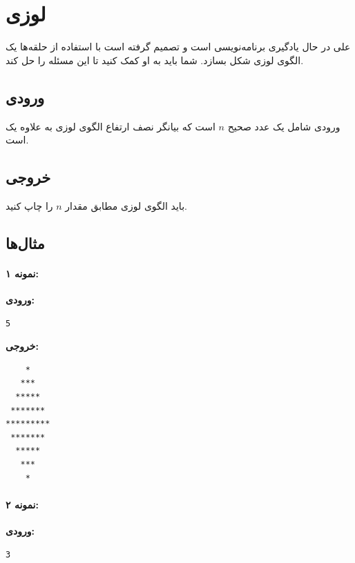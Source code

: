 \documentclass{article}
\begin{document}
\newpage

\section{لوزی}

علی در حال یادگیری برنامه‌نویسی است و تصمیم گرفته است با استفاده از حلقه‌ها یک الگوی لوزی شکل بسازد. شما باید به او کمک کنید تا این مسئله را حل کند.

\subsection{ورودی}

ورودی شامل یک عدد صحیح \( n \) است که بیانگر نصف ارتفاع الگوی لوزی به علاوه یک است.

\subsection{خروجی}

باید الگوی لوزی مطابق مقدار \( n \) را چاپ کنید.

\subsection{مثال‌ها}

\paragraph{نمونه ۱:}

\textbf{ورودی:}
\begin{LTR}
\begin{verbatim}
5
\end{verbatim}
\end{LTR}

\textbf{خروجی:}
\begin{LTR}
\begin{verbatim}
    *
   ***
  *****
 *******
*********
 *******
  *****
   ***
    *
\end{verbatim}
\end{LTR}

\paragraph{نمونه ۲:}

\textbf{ورودی:}
\begin{LTR}
\begin{verbatim}
3
\end{verbatim}
\end{LTR}
\end{document}
